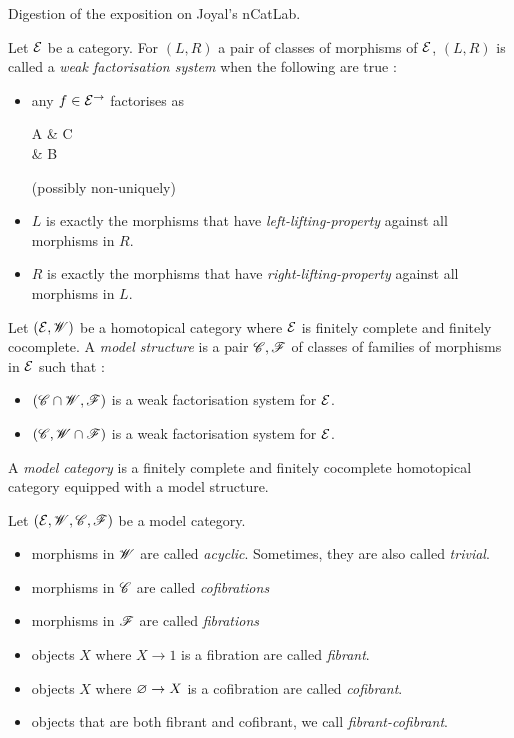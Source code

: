 \documentclass[./main.tex]{subfiles}
\begin{document}
\begin{rmk}
  Digestion of the exposition on Joyal's nCatLab.
\end{rmk}
  
\begin{dfn}

  Let $\mathcal{E}$ be a category. 
  For $(L,R)$ a pair of classes of morphisms of $\mathcal{E}$, 
  $(L,R)$ is called a \emph{weak factorisation system} when 
  the following are true : 
  \begin{itemize}
    \item any $f \in \mathcal{E}^\to$ factorises as 
    \begin{cd}
      A \ar[dr,"f"{swap}] \ar[r,"l \in L"]
        & C \ar[d,"r \in R"]\\
        & B
    \end{cd}
    (possibly non-uniquely)
    \item $L$ is exactly the morphisms that have \emph{left-lifting-property}
    against all morphisms in $R$.
    \item $R$ is exactly the morphisms that have \emph{right-lifting-property}
    against all morphisms in $L$. 
  \end{itemize}

  Let $(\mathcal{E} , \mathscr{W})$ be a homotopical category where
  $\mathcal{E}$ is finitely complete and finitely cocomplete.
  A \emph{model structure} is a pair $\mathscr{C}, \mathscr{F}$
  of classes of families of morphisms in $\mathcal{E}$ such that : 
  \begin{itemize}
    \item $(\mathscr{C} \cap \mathscr{W}, \mathscr{F})$ is a weak factorisation system for $\mathcal{E}$.
    \item $(\mathscr{C}, \mathscr{W} \cap \mathscr{F})$ is a weak factorisation system for $\mathcal{E}$. 
  \end{itemize}
  A \emph{model category} is a finitely complete and finitely cocomplete
  homotopical category equipped with a model structure. 
\end{dfn}

\begin{dfn}
  
  Let $(\mathcal{E} , \mathscr{W} , \mathscr{C} , \mathscr{F})$ be a model category. 
  \begin{itemize}
    \item morphisms in $\mathscr{W}$ are called \emph{acyclic}. 
    Sometimes, they are also called \emph{trivial}.
    \item morphisms in $\mathscr{C}$ are called \emph{cofibrations}
    \item morphisms in $\mathscr{F}$ are called \emph{fibrations}
    \item objects $X$ where $X \to 1$ is a fibration are called 
    \emph{fibrant}. 
    \item objects $X$ where $\varnothing \to X$ is a cofibration are called 
    \emph{cofibrant}. 
    \item objects that are both fibrant and cofibrant, 
    we call \emph{fibrant-cofibrant}.
  \end{itemize}
\end{dfn}
\end{document}
